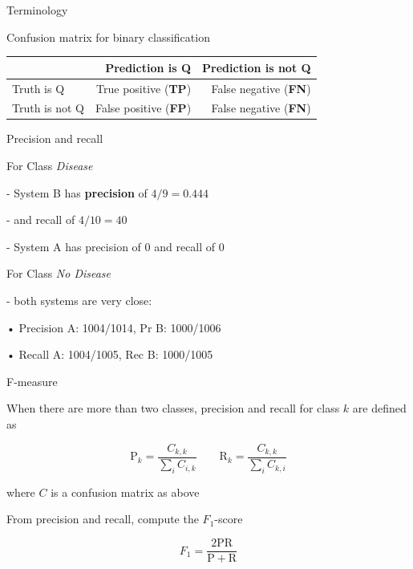\documentclass[12pt]{beamer}
\begin{document}
\begin{frame}{Terminology}
	
	Confusion matrix for binary classification
	
	\begin{table}
		\begin{footnotesize}
			\begin{tabular}{l|rr}
				& Prediction is Q & Prediction is not Q \\ \hline
				Truth is Q & True positive (\textbf{TP}) & False negative (\textbf{FN}) \\
				Truth is not Q & False positive (\textbf{FP}) & False negative (\textbf{FN}) 
			\end{tabular}
		\end{footnotesize}
	\end{table}
	
	
\end{frame}




\begin{frame}{Precision and recall}
	
For Class \emph{Disease}

- System B has \textbf{precision} of $4/9 = 0.444$

- and recall of $4/10 = 40$

- System A has precision of $0$ and recall of $0$

\bigskip

For Class \emph{No Disease}

- both systems are very close:

• Precision A: 1004/1014, Pr B: 1000/1006

• Recall A: 1004/1005, Rec B: 1000/1005

\end{frame}

\begin{frame}{F-measure}
	
When there are more than two classes, precision and recall for class $k$ are defined as

$$
\mathrm{P}_k = \frac{C_{k,k}}{ \sum_{i} C_{i,k}}
\qquad
\mathrm{R}_k =  \frac{C_{k,k}}{ \sum_{i} C_{k,i}}
$$

where $C$ is a confusion matrix as above

\bigskip

From precision and recall, compute the $F_1$-score 

$$
F_1 = \frac{2 \mathrm{P} \mathrm{R}}{\mathrm{P} + \mathrm{R}}
$$

	
\end{frame}
\end{document}
